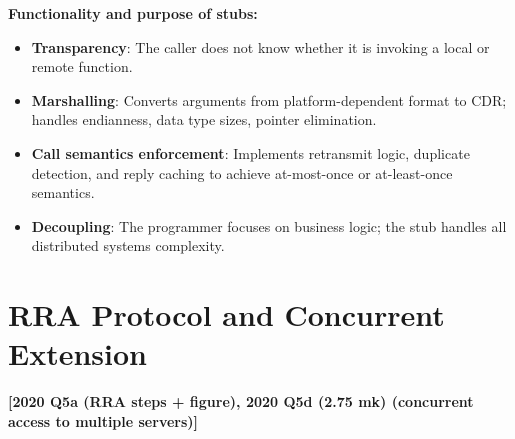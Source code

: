 \documentclass[11pt,a4paper]{article}
\newcommand{\qref}[1]{\textbf{\textcolor{examblue}{[#1]}}}
\newcommand{\mk}[1]{\textcolor{slidegray}{\small(#1 mk)}}
\begin{document}
\begin{answerbox}
\textbf{Functionality and purpose of stubs:}
\begin{itemize}
  \item \textbf{Transparency}: The caller does not know whether it is invoking a local or remote function.
  \item \textbf{Marshalling}: Converts arguments from platform-dependent format to CDR; handles endianness, data type sizes, pointer elimination.
  \item \textbf{Call semantics enforcement}: Implements retransmit logic, duplicate detection, and reply caching to achieve at-most-once or at-least-once semantics.
  \item \textbf{Decoupling}: The programmer focuses on business logic; the stub handles all distributed systems complexity.
\end{itemize}
\end{answerbox}

\section{RRA Protocol and Concurrent Extension}
\qref{2020 Q5a (RRA steps + figure), 2020 Q5d \mk{2.75} (concurrent access to multiple servers)}
\end{document}
